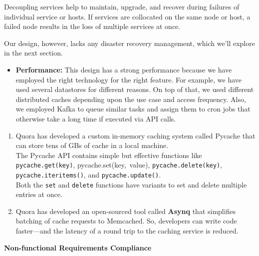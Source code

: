 Decoupling services help to maintain, upgrade, and recover during failures of individual service or hosts. If services are collocated on the same node or host, a failed node results in the loss of multiple services at once.

Our design, however, lacks any disaster recovery management, which we'll explore in the next section.

\begin{itemize}
\item
\protect{}\label{jZgPCoXdzVyZI9kS9XG8T}
\textbf{Performance:} This design has a strong performance because we have employed the right technology for the right feature. For example, we have used several datastores for different reasons. On top of that, we used different distributed caches depending upon the use case and access frequency. Also, we employed Kafka to queue similar tasks and assign them to cron jobs that otherwise take a long time if executed via API calls.
\end{itemize}

\begin{enumerate}
\def\labelenumi{\arabic{enumi}.}
\item
Quora has developed a custom in-memory caching system called Pycache that can store tens of GBs of cache in a local machine.
\\
The Pycache API contains simple but effective functions like \texttt{pycache.get(key)}, pycache.set(key,\ value), \texttt{pycache.delete(key)}, \texttt{pycache.iteritems()}, and \texttt{pycache.update()}.
\\
Both the \texttt{set} and \texttt{delete} functions have variants to set and delete multiple entries at once.
\item
Quora has developed an open-sourced tool called \textbf{Asynq} that simplifies batching of cache requests to Memcached. So, developers can write code faster---and the latency of a round trip to the caching service is reduced.
\end{enumerate}

\textbf{Non-functional Requirements Compliance}

